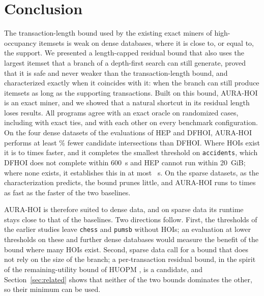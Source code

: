 \documentclass[pdflatex,sn-mathphys,Numbered]{sn-jnl}
\theoremstyle{thmstyleone}
\theoremstyle{thmstyletwo}
\theoremstyle{thmstylethree}
\newcommand{\AURA}{AURA-HOI}
\begin{document}
\section{Conclusion}\label{sec:concl}

The transaction-length bound used by the existing exact miners of high-occupancy itemsets is weak on dense databases, where it is close to, or equal to, the support. We presented a length-capped residual bound that also uses the largest itemset that a branch of a depth-first search can still generate, proved that it is safe and never weaker than the transaction-length bound, and characterized exactly when it coincides with it: when the branch can still produce itemsets as long as the supporting transactions. Built on this bound, \AURA{} is an exact miner, and we showed that a natural shortcut in its residual length loses results. All programs agree with an exact oracle on \NumOracleCases{} randomized cases, including \NumOracleTies{} with exact ties, and with each other on every benchmark configuration. On the four dense datasets of the evaluations of HEP and DFHOI, \AURA{} performs at least \NodeReductionMinDense{}\% fewer candidate intersections than DFHOI. Where HOIs exist it is \MinSpeedupDenseNonEmpty{} to \MaxSpeedupDenseNonEmpty{} times faster, and it completes the smallest threshold on \texttt{accidents}, which DFHOI does not complete within 600~s and HEP cannot run within 20~GiB; where none exists, it establishes this in at most \AuraMaxTimeEmptyDense{}~s. On the sparse datasets, as the characterization predicts, the bound prunes little, and \AURA{} runs \SparseVsBestMin{} to \SparseVsBestMax{} times as fast as the faster of the two baselines.

\AURA{} is therefore suited to dense data, and on sparse data its runtime stays close to that of the baselines. Two directions follow. First, the thresholds of the earlier studies leave \texttt{chess} and \texttt{pumsb} without HOIs; an evaluation at lower thresholds on these and further dense databases would measure the benefit of the bound where many HOIs exist. Second, sparse data call for a bound that does not rely on the size of the branch; a per-transaction residual bound, in the spirit of the remaining-utility bound of HUOPM \cite{gan2020huopm}, is a candidate, and Section~\ref{sec:related} shows that neither of the two bounds dominates the other, so their minimum can be used.

\backmatter
\end{document}
